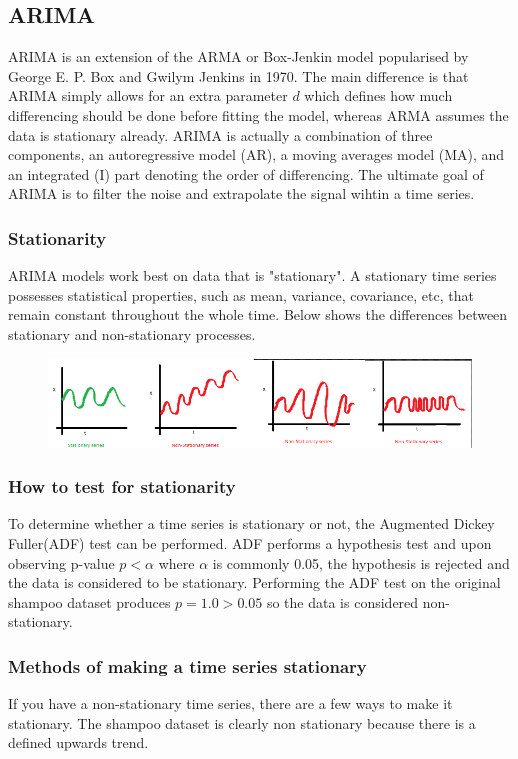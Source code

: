 \documentclass{article}
\begin{document}
  \subsection{ARIMA}
    ARIMA is an extension of the ARMA or Box-Jenkin model popularised by George E. P. Box and Gwilym Jenkins in 1970. The main difference is that ARIMA simply allows for an extra parameter $d$ which defines how much differencing should be done before fitting the model, whereas ARMA assumes the data is stationary already. 
    ARIMA is actually a combination of three components, an autoregressive model (AR), a moving averages model (MA), and an integrated (I) part denoting the order of differencing. The ultimate goal of ARIMA is to filter the noise and extrapolate the signal wihtin a time series.
  
  \subsubsection{Stationarity}
    ARIMA models work best on data that is "stationary". A stationary time series possesses statistical properties, such as mean, variance, covariance, etc, that remain constant throughout the whole time.
    Below shows the differences between stationary and non-stationary processes.
    \begin{figure}[H]
      \centering
      \includegraphics[scale=0.8]{stationary_time_series.png}
    \end{figure}

  \subsubsection{How to test for stationarity}
    To determine whether a time series is stationary or not, the Augmented Dickey Fuller(ADF) test can be performed. ADF performs a hypothesis test and upon observing p-value $p < \alpha$ where $\alpha$ is commonly 0.05, the hypothesis is rejected and the data is considered to be stationary. Performing the ADF test on the original shampoo dataset produces $p=1.0>0.05$ so the data is considered non-stationary.

  \subsubsection{Methods of making a time series stationary}
    If you have a non-stationary time series, there are a few ways to make it stationary. The shampoo dataset is clearly non stationary because there is a defined upwards trend.
\end{document}
